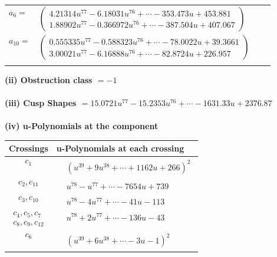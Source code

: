 \documentclass[1p]{elsarticle_modified}
\theoremstyle{definition}
\begin{document}
\begin{tabular}{m{7pt} m{180pt} m{7pt} m{180pt} }
\flushright $a_{6}=$&$\begin{pmatrix}4.21314 u^{77}-6.18031 u^{76}+\cdots-353.473 u+453.881\\1.88902 u^{77}-0.366972 u^{76}+\cdots-387.504 u+407.067\end{pmatrix}$ \\
\flushright $a_{10}=$&$\begin{pmatrix}0.555335 u^{77}-0.588323 u^{76}+\cdots-78.0022 u+39.3661\\3.00021 u^{77}-6.16888 u^{76}+\cdots-82.8724 u+226.957\end{pmatrix}$\\&\end{tabular}
\flushleft \textbf{(ii) Obstruction class $= -1$}\\~\\
\flushleft \textbf{(iii) Cusp Shapes $= 15.0721 u^{77}-15.2353 u^{76}+\cdots-1631.33 u+2376.87$}\\~\\
\newpage\renewcommand{\arraystretch}{1}
\flushleft \textbf{(iv) u-Polynomials at the component}\newline \\
\begin{tabular}{m{50pt}|m{274pt}}
Crossings & \hspace{64pt}u-Polynomials at each crossing \\
\hline $$\begin{aligned}c_{1}\end{aligned}$$&$\begin{aligned}
&(u^{39}+9 u^{38}+\cdots+1162 u+266)^{2}
\end{aligned}$\\
\hline $$\begin{aligned}c_{2},c_{11}\end{aligned}$$&$\begin{aligned}
&u^{78}- u^{77}+\cdots-7654 u+739
\end{aligned}$\\
\hline $$\begin{aligned}c_{3},c_{10}\end{aligned}$$&$\begin{aligned}
&u^{78}-4 u^{77}+\cdots-41 u-113
\end{aligned}$\\
\hline $$\begin{aligned}c_{4},c_{5},c_{7}\\c_{8},c_{9},c_{12}\end{aligned}$$&$\begin{aligned}
&u^{78}+2 u^{77}+\cdots-136 u-43
\end{aligned}$\\
\hline $$\begin{aligned}c_{6}\end{aligned}$$&$\begin{aligned}
&(u^{39}+6 u^{38}+\cdots-3 u-1)^{2}
\end{aligned}$\\
\hline
\end{tabular}\\~\\
\end{document}
